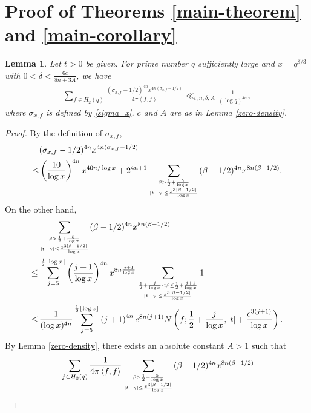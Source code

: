 \documentclass[11pt,reqno]{amsart}
\newcommand{\bna}{\begin{eqnarray*}}
\newcommand{\ena}{\end{eqnarray*}}
\numberwithin{equation}{section}
\theoremstyle{plain}
\newtheorem{lemma}{Lemma}[section]
\theoremstyle{definition}
\begin{document}
\section{Proof of Theorems \ref{main-theorem} and \ref{main-corollary}}
\begin{lemma}\label{lemma 6}
Let $t>0$ be given. For prime number $q$ sufficiently large and $x=q^{\delta/3}$ with
$0<\delta<\frac{6c}{8n+3A}$, we have
\bna
\sum_{f\in H_2(q)}\frac{(\sigma_{x,f}-1/2)^{4n}x^{4n(\sigma_{x,f}-1/2)}}{4\pi \left<f,f\right>}
\ll_{t,n,\delta,A}\frac{1}{(\log q)^{4n}},
\ena
where $\sigma_{x,f}$ is defined by \eqref{sigma_x}, $c$ and $A$ are as in Lemma \ref{zero-density}.
\end{lemma}
\begin{proof}
By the definition of $\sigma_{x,f}$,
\begin{equation*}
\begin{split}
&(\sigma_{x,f}-1/2)^{4n}x^{4n(\sigma_{x,f}-1/2)}\\
\leq&\left(\frac{10}{\log x}\right)^{4n}x^{40n/\log x}
+2^{4n+1}\sum_{\beta>\frac{1}{2}+\frac{5}{\log x}\atop |t-\gamma|\leq\frac{x^{3|\beta-1/2|}}{\log x}}
(\beta-1/2)^{4n}x^{8n(\beta-1/2)}.
\end{split}
\end{equation*}
On the other hand,
\begin{equation*}
\begin{split}
&\sum_{\beta>\frac{1}{2}+\frac{5}{\log x}\atop |t-\gamma|\leq\frac{x^{3|\beta-1/2|}}{\log x}}
(\beta-1/2)^{4n}x^{8n(\beta-1/2)}\\
\leq&\,\sum_{j=5}^{\frac{1}{2}\lfloor\log x\rfloor}\left(\frac{j+1}{\log x}\right)^{4n}
x^{8n\frac{j+1}{\log x}}\sum_{\frac{1}{2}+\frac{j}{\log x}<\beta\leq\frac{1}{2}+\frac{j+1}{\log x}
\atop |t-\gamma|\leq\frac{x^{3|\beta-1/2|}}{\log x}}1\\
\leq&\,\frac{1}{(\log x)^{4n}}\sum_{j=5}^{\frac{1}{2}\lfloor\log x\rfloor}\left(j+1\right)^{4n}
e^{8n(j+1)}N\left(f;\frac{1}{2}+\frac{j}{\log x}, |t|+\frac{e^{3(j+1)}}{\log x}\right).
\end{split}
\end{equation*}
By Lemma \ref{zero-density}, there exists an absolute constant $A>1$ such that
\begin{equation*}
\begin{split}
&\sum_{f\in H_2(q)}\frac{1}{4\pi \left<f,f\right>}
\sum_{\beta>\frac{1}{2}+\frac{5}{\log x}\atop |t-\gamma|\leq\frac{x^{3|\beta-1/2|}}{\log x}}
(\beta-1/2)^{4n}x^{8n(\beta-1/2)}\\

\end{split}
\end{equation*}
\end{proof}
\end{document}
